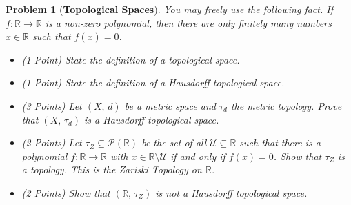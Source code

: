 \documentclass{article}
\theoremstyle{normal}
\newtheorem{problem}{Problem}
\begin{document}
    \begin{problem}[\textbf{Topological Spaces}]
        \par\hfill\par\vspace{1em}
        You may freely use the following fact. If
        $f:\mathbb{R}\rightarrow\mathbb{R}$ is a non-zero polynomial, then
        there are only finitely many numbers $x\in\mathbb{R}$ such that
        $f(x)=0$.
        \begin{itemize}
            \item (1 Point) State the definition of a topological space.
            \item (1 Point) State the definition of a
                Hausdorff topological space.
            \item (3 Points) Let $(X,\,d)$ be a metric space and $\tau_{d}$ the
                metric topology. Prove that $(X,\,\tau_{d})$ is a Hausdorff
                topological space.
            \item (2 Points) Let $\tau_{Z}\subseteq\mathcal{P}(\mathbb{R})$ be
                the set of all $\mathcal{U}\subseteq\mathbb{R}$ such that
                there is a polynomial $f:\mathbb{R}\rightarrow\mathbb{R}$
                with $x\in\mathbb{R}\setminus\mathcal{U}$ if and only if
                $f(x)=0$. Show that $\tau_{Z}$ is a topology. This is the
                \textit{Zariski Topology} on $\mathbb{R}$.
            \item (2 Points) Show that $(\mathbb{R},\,\tau_{Z})$ is not
                a Hausdorff topological space.
        \end{itemize}
    \end{problem}
\end{document}
